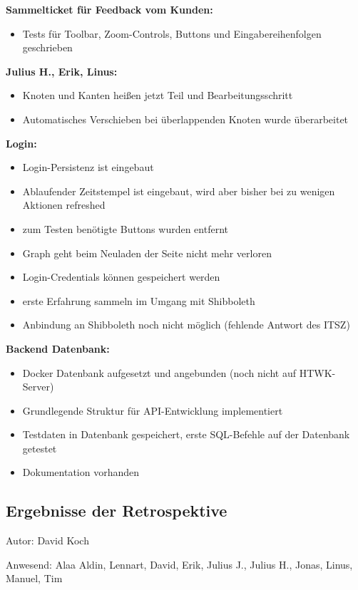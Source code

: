\textbf{Sammelticket für Feedback vom Kunden:}
\begin{itemize}
\item Tests für Toolbar, Zoom-Controls, Buttons und Eingabereihenfolgen geschrieben
\end{itemize}

\textbf{Julius H., Erik, Linus:}
\begin{itemize}
\item Knoten und Kanten heißen jetzt Teil und Bearbeitungsschritt
\item Automatisches Verschieben bei überlappenden Knoten wurde überarbeitet
\end{itemize}

\textbf{Login:}
\begin{itemize}
\item Login-Persistenz ist eingebaut
\item Ablaufender Zeitstempel ist eingebaut, wird aber bisher bei zu wenigen Aktionen refreshed
\item zum Testen benötigte Buttons wurden entfernt
\item Graph geht beim Neuladen der Seite nicht mehr verloren
\item Login-Credentials können gespeichert werden
\item erste Erfahrung sammeln im Umgang mit Shibboleth
\item Anbindung an Shibboleth noch nicht möglich (fehlende Antwort des ITSZ)
\end{itemize}

\textbf{Backend Datenbank:}
\begin{itemize}
\item Docker Datenbank aufgesetzt und angebunden (noch nicht auf HTWK-Server)
\item Grundlegende Struktur für API-Entwicklung implementiert
\item Testdaten in Datenbank gespeichert, erste SQL-Befehle auf der Datenbank getestet
\item Dokumentation vorhanden
\end{itemize}

\subsection{Ergebnisse der Retrospektive}
{\small Autor: David Koch}

Anwesend: Alaa Aldin, Lennart, David, Erik, Julius J., Julius H., Jonas, Linus, Manuel, Tim\\

